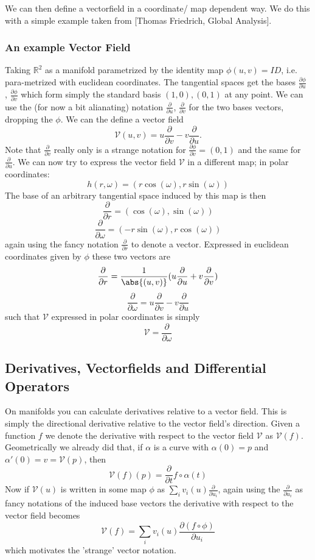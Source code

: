 We can then define a vectorfield in a coordinate/ map dependent way. We do this with a simple example taken from [Thomas Friedrich, Global Analysis].

\subsubsection{An example Vector Field} Taking $\mathbb R^2$ as a manifold parametrized by the identity map $\phi(u,v) = ID$, i.e. para-metrized with euclidean coordinates. The tangential spaces get the bases $\frac{\partial \phi}{\partial u}$ , $\frac{\partial \phi}{\partial v}$ which form simply the standard basis $(1,0), (0,1)$ at any point. We can use the (for now a bit alianating) notation $  \frac{\partial}{\partial u}$, $\frac{\partial}{\partial v}$ for the two bases vectors, dropping the $\phi$. We can the define a vector field
\[\mathcal V(u,v) = u \frac{\partial }{\partial v} - v \frac{\partial }{\partial u}.\]
Note that $\frac{\partial }{\partial v}$ really only is a strange notation for $\frac{\partial \phi}{\partial v} = (0,1)$ and the same for $\frac{\partial }{\partial u}$. We can now try to express the vector field $\mathcal V$ in a different map; in polar coordinates:
\[h(r,\omega) = (r \cos (\omega), r \sin (\omega))\]
The base of an arbitrary tangential space induced by this map is then
\[\frac{\partial}{\partial r} = (\cos(\omega), \sin(\omega)) \]
\[\frac{\partial}{\partial \omega} = (-r \sin(\omega), r\cos(\omega))\]
again using the fancy notation $\frac{\partial}{\partial r}$ to denote a vector. Expressed in euclidean coordinates given by $\phi$ these two vectors are
\[\frac{\partial}{\partial r} = \frac{1}{\abs{(u,v)}} ( u \frac{\partial }{\partial u} + v \frac{\partial }{\partial v} ) \]
\[\frac{\partial}{\partial \omega} = u \frac{\partial }{\partial v} - v \frac{\partial }{\partial u}\]
such that $\mathcal V$ expressed in polar coordinates is simply
\[\mathcal V = \frac{\partial}{\partial \omega}\]


\subsection{Derivatives, Vectorfields and Differential Operators}
On manifolds you can calculate derivatives relative to a vector field. This is simply the directional derivative relative to the vector field's direction. Given a function $f$ we denote the derivative with respect to the vector field $\mathcal V$ as $\mathcal V (f)$. Geometrically we already did that, if $\alpha$ is a curve with $\alpha(0) = p$ and $\alpha'(0)= v = \mathcal V (p)$, then
\[\mathcal V (f) (p) = \frac{\partial }{\partial t} f \circ \alpha(t)\]
Now if $\mathcal V(u)$ is written in some map $\phi$ as $\sum_i v_i(u) \frac{\partial}{\partial u_i}$, again using the $\frac{\partial}{\partial u_i}$ as fancy notations of the induced base vectors the derivative with respect to the vector field becomes
\[\mathcal V (f) = \sum_i v_i(u)\frac{\partial(f \circ \phi)}{\partial u_i}\]
which motivates the 'strange' vector notation. 

